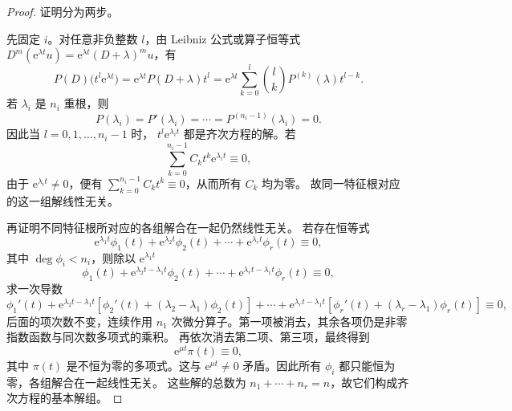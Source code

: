 \begin{proof}
	证明分为两步。

	先固定 $i$。对任意非负整数 $l$，由 Leibniz 公式或算子恒等式
	$D^m(\mathrm{e}^{\lambda t}u)=\mathrm{e}^{\lambda t}(D+\lambda)^mu$，有
	\[
		P(D)\bigl(t^l\mathrm{e}^{\lambda t}\bigr)
		=\mathrm{e}^{\lambda t}P(D+\lambda)t^l
		=\mathrm{e}^{\lambda t}
		\sum_{k=0}^{l}\binom{l}{k}P^{(k)}(\lambda)t^{l-k}.
	\]
	若 $\lambda_i$ 是 $n_i$ 重根，则
	\[
		P(\lambda_i)=P'(\lambda_i)=\cdots
		=P^{(n_i-1)}(\lambda_i)=0.
	\]
	因此当 $l=0,1,\ldots,n_i-1$ 时，
	$t^l\mathrm{e}^{\lambda_it}$ 都是齐次方程的解。若
	\[
		\sum_{k=0}^{n_i-1}C_kt^k\mathrm{e}^{\lambda_it}\equiv0,
	\]
	由于 $\mathrm{e}^{\lambda_it}\neq0$，便有
	$\sum\limits_{k=0}^{n_i-1}C_kt^k\equiv0$，从而所有 $C_k$ 均为零。
	故同一特征根对应的这一组解线性无关。

	再证明不同特征根所对应的各组解合在一起仍然线性无关。
	若存在恒等式
	\[
		\mathrm{e}^{\lambda_1t}\phi_1(t)
		+\mathrm{e}^{\lambda_2t}\phi_2(t)
		+\cdots
		+\mathrm{e}^{\lambda_rt}\phi_r(t)\equiv0,
	\]
	其中 $\deg\phi_i<n_i$，则除以 $\mathrm{e}^{\lambda_1t}$ 
	\[
	\phi_1(t)
	+\mathrm{e}^{\lambda_2t-\lambda_1t}\phi_2(t)
	+\cdots
	+\mathrm{e}^{\lambda_rt-\lambda_1t}\phi_r(t)\equiv0,\]
	求一次导数
	\[	\phi_1'(t)
	+\mathrm{e}^{\lambda_2t-\lambda_1t}[\phi_2'(t)+(\lambda_2-\lambda_1)\phi_2(t)]
	+\cdots
	+\mathrm{e}^{\lambda_rt-\lambda_1t}[\phi_r'(t)+(\lambda_r-\lambda_1)\phi_r(t)]\equiv0,\]
	后面的项次数不变，连续作用
	$n_1$ 次微分算子。第一项被消去，其余各项仍是非零指数函数与同次数多项式的乘积。
	再依次消去第二项、第三项，最终得到
	\[
		\mathrm{e}^{\mu t}\pi(t)\equiv0,
	\]
	其中 $\pi(t)$ 是不恒为零的多项式。这与
	$\mathrm{e}^{\mu t}\neq0$ 矛盾。因此所有 $\phi_i$ 都只能恒为零，各组解合在一起线性无关。
	这些解的总数为 $n_1+\cdots+n_r=n$，故它们构成齐次方程的基本解组。
\end{proof}

